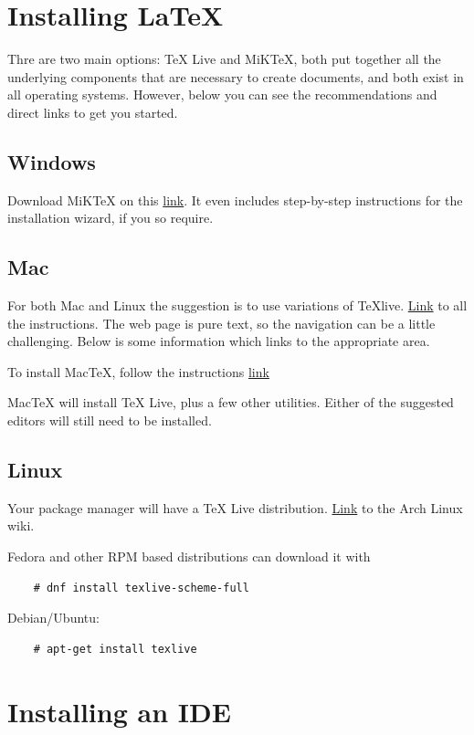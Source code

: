 \section{Installing \LaTeX}
Thre are two main options: TeX Live and MiKTeX, both put together all the underlying components that are necessary to create documents, and both exist in all operating systems.
However, below you can see the recommendations and direct links to get you started.

\subsection{Windows}
Download MiKTeX on this \href{https://miktex.org/download}{link}.
It even includes step-by-step instructions for the installation wizard, if you so require.

\subsection{Mac}
For both Mac and Linux the suggestion is to use variations of TeXlive.  
\href{https://www.tug.org/texlive/}{Link} to all the instructions.
The web page is pure text, so the navigation can be a little challenging.
Below is some information which links to the appropriate area.

To install MacTeX, follow the instructions \href{https://www.tug.org/mactex/mactex-download.html}{link}

MacTeX will install TeX Live, plus a few other utilities.
Either of the suggested editors will still need to be installed.  

\subsection{Linux}
Your package manager will have a TeX Live distribution. \href{https://wiki.archlinux.org/title/TeX_Live}{Link} to the Arch Linux wiki.

Fedora and other RPM based distributions can download it with
\begin{lstlisting}
    # dnf install texlive-scheme-full
\end{lstlisting}

Debian/Ubuntu:
\begin{lstlisting}
    # apt-get install texlive
\end{lstlisting}

\section{Installing an IDE}
